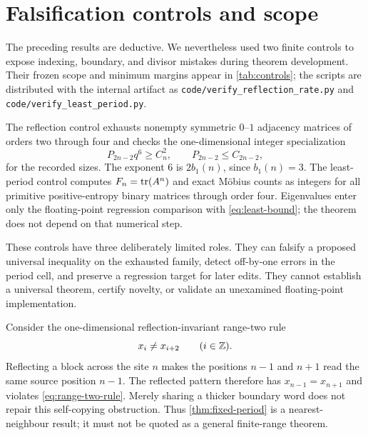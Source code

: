 \section{Falsification controls and scope}
\label{sec:controls}

The preceding results are deductive.  We nevertheless used two finite
controls to expose indexing, boundary, and divisor mistakes during theorem
development.  Their frozen scope and minimum margins appear in
\cref{tab:controls}; the scripts are distributed with the internal artifact
as \texttt{code/verify\_reflection\_rate.py} and
\texttt{code/verify\_least\_period.py}.



The reflection control exhausts nonempty symmetric $0$--$1$ adjacency
matrices of orders two through four and checks the one-dimensional integer
specialization
\[
 P_{2n-2}q^6\ge C_n^2,
 \qquad P_{2n-2}\le C_{2n-2},
\]
for the recorded sizes.  The exponent $6$ is $2b_1(n)$, since $b_1(n)=3$.
The least-period control computes $F_n=\operatorname{tr}(A^n)$ and exact M\"obius counts as
integers for all primitive positive-entropy binary matrices through order
four.  Eigenvalues enter only the floating-point regression comparison with
\cref{eq:least-bound}; the theorem does not depend on that numerical step.

These controls have three deliberately limited roles.  They can falsify a
proposed universal inequality on the exhausted family, detect off-by-one
errors in the period cell, and preserve a regression target for later edits.
They cannot establish a universal theorem, certify novelty, or validate an
unexamined floating-point implementation.

\begin{example}
\label{ex:range-two}
Consider the one-dimensional reflection-invariant range-two rule
\begin{equation}
 x_i\ne x_{i+2} \qquad(i\in\mathbb Z).
 \label{eq:range-two-rule}
\end{equation}
Reflecting a block across the site $n$ makes the positions $n-1$ and $n+1$
read the same source position $n-1$.  The reflected pattern therefore has
$x_{n-1}=x_{n+1}$ and violates \cref{eq:range-two-rule}.  Merely sharing a
thicker boundary word does not repair this self-copying obstruction.  Thus
\cref{thm:fixed-period} is a nearest-neighbour result; it must not be quoted
as a general finite-range theorem.
\end{example}

